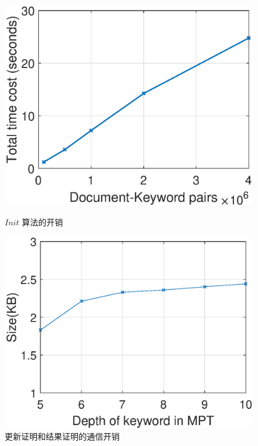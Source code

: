 
\begin{figure}[bhpt]
\centering
  \begin{minipage}[b]{0.48 \textwidth}
    \includegraphics[width=\textwidth]{expr/initialization}
    \caption{$Init$ 算法的开销}
    \label{fig:init}
  \end{minipage}
  \begin{minipage}[b]{0.48 \textwidth}
    \includegraphics[width=\textwidth]{expr/proof}
    \caption{更新证明和结果证明的通信开销}
    \label{fig:proof}
  \end{minipage}


  \hspace{-40.0pt}
  \par \vspace{-10.pt}
  \hspace{-36.0pt}


\end{figure}
